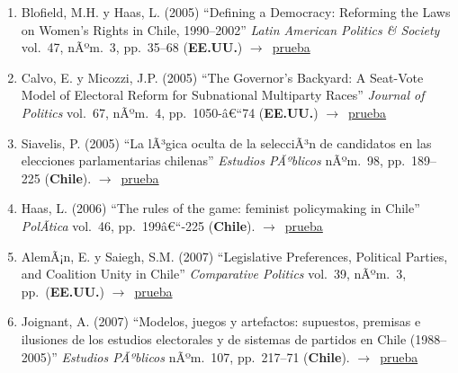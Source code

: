 \documentclass[12 pt, letter]{article}
\newenvironment{CitasMiTrabajo}{
    \begin{footnotesize}
    \begin{enumerate}[label={\footnotesize\emph{cita~\arabic*}},ref=\arabic*] %
        \setlength{\itemsep}{.1\itemsep}
        \setlength{\parskip}{.1\parskip}
    }{\end{enumerate}\end{footnotesize}}
\begin{document}
\begin{CitasMiTrabajo}

        \item Blofield, M.H. y Haas, L. (2005)
        ``Defining a Democracy: Reforming the Laws on Women's Rights in Chile, 1990--2002'' \emph{Latin American
        Politics \& Society} vol.\ 47, nÃºm.\ 3, pp.\ 35--68  (\textbf{EE.UU.}) $\rightarrow$~\href{http://ericmagar.com/cv/cites/mrs/blofieldHaas.pdf}{prueba}

        \item Calvo, E. y Micozzi, J.P. (2005)
        ``The Governor's Backyard: A
        Seat-Vote Model of Electoral Reform for Subnational Multiparty Races''
        \emph{Journal of Politics} vol.\ 67, nÃºm.\ 4, pp.\ 1050-â€“74 (\textbf{EE.UU.}) $\rightarrow$~\href{http://ericmagar.com/cv/cites/mrs/calvoMicozzi.pdf}{prueba}

        \item Siavelis, P. (2005)
        ``La lÃ³gica oculta de la selecciÃ³n de candidatos en las elecciones parlamentarias chilenas''
            \emph{Estudios PÃºblicos}
        nÃºm.\ 98, pp.\ 189--225 (\textbf{Chile}). $\rightarrow$~\href{http://ericmagar.com/cv/cites/mrs/Siavelis2005logicaoculta.pdf}{prueba}

        \item Haas, L. (2006)
        ``The rules of the game: feminist policymaking in Chile''
        \emph{PolÃ­tica}
        vol.\ 46,
        pp.\ 199â€“-225   (\textbf{Chile}). $\rightarrow$~\href{http://ericmagar.com/cv/cites/mrs/haas2006politica.pdf}{prueba}

        \item AlemÃ¡n, E. y Saiegh, S.M. (2007)
        ``Legislative Preferences,
        Political Parties, and Coalition Unity in Chile'' \emph{Comparative
        Politics} vol.\ 39, nÃºm.\ 3, pp.\ (\textbf{EE.UU.}) $\rightarrow$~\href{http://ericmagar.com/cv/cites/mrs/alemanSaiegh07.pdf}{prueba}

        \item Joignant, A. (2007)
        ``Modelos, juegos y artefactos: supuestos, premisas e ilusiones de los estudios electorales y de sistemas de partidos
        en Chile (1988--2005)'' \emph{Estudios PÃºblicos} nÃºm.\ 107, pp.\ 217--71  (\textbf{Chile}). $\rightarrow$~\href{http://ericmagar.com/cv/cites/mrs/joignant07.pdf}{prueba}


\end{CitasMiTrabajo}
\end{document}
